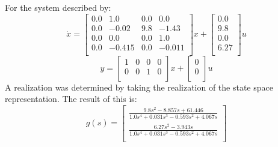 For the system described by: \begin{equation}
\dot x = \begin{bmatrix}
0.0&1.0&0.0&0.0\\
0.0&-0.02&9.8&-1.43\\
0.0&0.0&0.0&1.0\\
0.0&-0.415&0.0&-0.011\\
\end{bmatrix}
x + \begin{bmatrix}
0.0\\
9.8\\
0.0\\
6.27\\
\end{bmatrix}
u
\end{equation}
\begin{equation}
y = \begin{bmatrix}
1&0&0&0\\
0&0&1&0\\
\end{bmatrix}
x + \begin{bmatrix}
0\\
0\\
\end{bmatrix}
u
\end{equation}
A realization was determined by taking the realization of the state space representation. The result of this is: \begin{equation}g(s) = \begin{bmatrix}
\frac{9.8s^{2} - 8.857s + 61.446}{1.0s^{4} + 0.031s^{3} - 0.593s^{2} + 4.067s}\\
\frac{6.27s^{2} - 3.943s}{1.0s^{4} + 0.031s^{3} - 0.593s^{2} + 4.067s}\\
\end{bmatrix}
\end{equation}